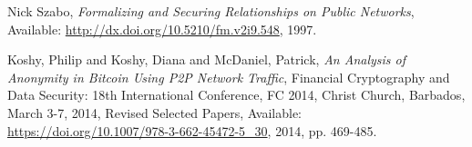 \begin{thebibliography}{1}
  Nick Szabo,
  \emph{Formalizing and Securing Relationships on Public Networks},
  Available: \url{http://dx.doi.org/10.5210/fm.v2i9.548},
  1997.

   Koshy, Philip and Koshy, Diana and McDaniel, Patrick,
  \emph{An Analysis of Anonymity in Bitcoin Using P2P Network Traffic},
  Financial Cryptography and Data Security: 18th International Conference, FC
2014, Christ Church, Barbados, March 3-7, 2014, Revised Selected Papers,
  Available: \url{https://doi.org/10.1007/978-3-662-45472-5_30},
  2014, pp. 469-485.

\end{thebibliography}
